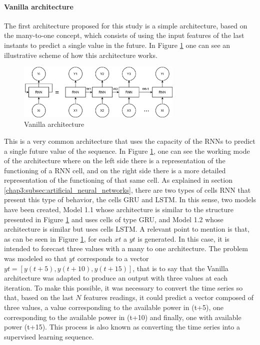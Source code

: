 \paragraph{Vanilla architecture}

The first architecture proposed for this study is a simple architecture, based on the many-to-one concept, which consists of using the input features of the last instants to predict a single value in the future. 
In Figure \ref{arc1} one can see an illustrative scheme of how this architecture works.

\begin{figure}[h!]
    \centering
    \begin{center}
    \includegraphics[width=0.7\textwidth]{Images/arc1.png}
    \caption{Vanilla architecture}
    \label{arc1}
    \end{center}
\end{figure}

This is a very common architecture that uses the capacity of the \ac{RNN}s to predict a single future value of the sequence. In Figure \ref{arc1}, one can see the working mode of the architecture where on the left side there is a representation of the functioning of a RNN cell, and on the right side there is a more detailed representation of the functioning of that same cell. As explained in section \ref{chap3:subsec:artificial_neural_networks}, there are two types of cells \ac{RNN} that present this type of behavior, the cells \ac{GRU} and \ac{LSTM}. In this sense, two models have been created, Model 1.1 whose architecture is similar to the structure presented in Figure \ref{arc1} and uses cells of type \ac{GRU}, and Model 1.2 whose architecture is similar but uses cells \ac{LSTM}. A relevant point to mention is that, as can be seen in Figure \ref{arc1}, for each $xt$ a $yt$ is generated. In this case, it is intended to forecast three values with a many to one architecture. The problem was modeled so that $yt$ corresponds to a vector $yt = [y(t+5), y(t+10), y(t+15)]$, that is to say that the Vanilla architecture was adapted to produce an output with three values at each iteration. To make this possible, it was necessary to convert the time series so that, based on the last $N$ features readings, it could predict a vector composed of three values, a value corresponding to the available power in (t+5), one corresponding to the available power in (t+10) and finally, one with available power (t+15). This process is also known as converting the time series into a supervised learning sequence.



